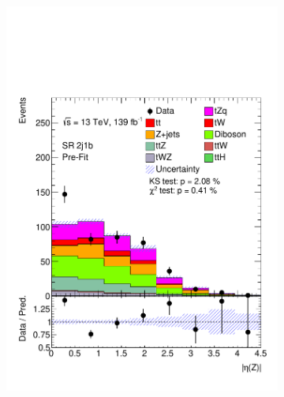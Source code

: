 \begin{figure}
\begin{subfigure}[b]{0.32\linewidth}
    \includegraphics[width=\linewidth]{ubonn-thesis/Chapters/Chapters_06/Figure/Input_distribution/SR_2j1b_Z_eta.pdf} 
  \end{subfigure}%
  \hspace*{0.3cm}
  \centering
  \begin{subfigure}[b]{0.32\linewidth}

\end{subfigure}
\end{figure}
